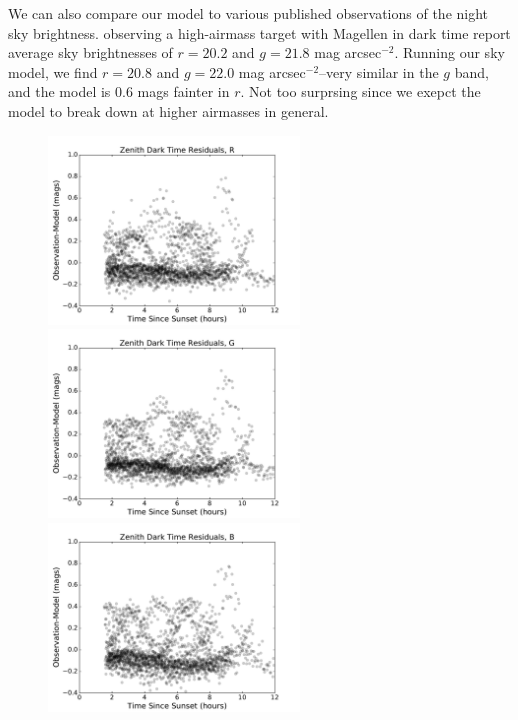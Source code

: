 \documentclass[]{spie}
\begin{document}
We can also compare our model to various published observations of the night sky brightness.  \cite{Galaz15} observing a high-airmass target with Magellen in dark time report average sky brightnesses of $r=20.2$ and $g=21.8$ mag arcsec$^{-2}$.  Running our sky model, we find  $r=20.8$ and $g=22.0$ mag arcsec$^{-2}$--very similar in the $g$ band, and the model is 0.6 mags fainter in $r$.  Not too surprsing since we exepct the model to break down at higher airmasses in general.

\begin{figure}
  \includegraphics[height=5cm]{plots/residTON_R.pdf}\includegraphics[height=5cm]{plots/residTON_G.pdf}\includegraphics[height=5cm]{plots/residTON_B.pdf} \\

\end{figure}
\end{document}
